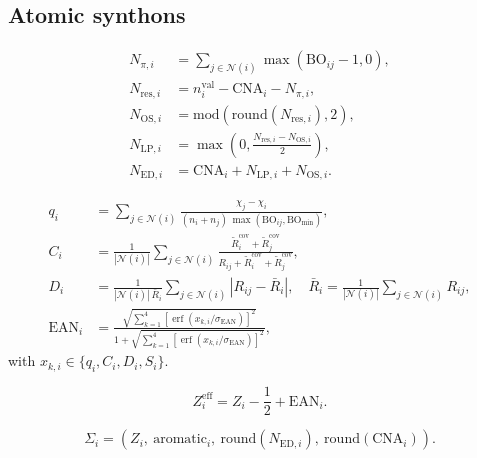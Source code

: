 \documentclass[journal=jctcce,manuscript=article]{achemso}
\begin{document}
\subsection{Atomic synthons}
\begin{align}
N_{\pi,i} &= \sum_{j\in\mathcal{N}(i)} \max(\mathrm{BO}_{ij}-1,0),\\
N_{\mathrm{res},i} &= n^{\mathrm{val}}_i-\mathrm{CNA}_i-N_{\pi,i},\\
N_{\mathrm{OS},i} &= \mathrm{mod}\!\left(\mathrm{round}(N_{\mathrm{res},i}),2\right),\\
N_{\mathrm{LP},i} &= \max\!\left(0,\frac{N_{\mathrm{res},i}-N_{\mathrm{OS},i}}{2}\right),\\
N_{\mathrm{ED},i} &= \mathrm{CNA}_i+N_{\mathrm{LP},i}+N_{\mathrm{OS},i}.
\end{align}

\begin{align}
q_i &= \sum_{j\in\mathcal{N}(i)}
\frac{\chi_j-\chi_i}{(n_i+n_j)\,\max(\mathrm{BO}_{ij},\mathrm{BO}_{\min})},\\
C_i &= \frac{1}{|\mathcal{N}(i)|}\sum_{j\in\mathcal{N}(i)}
\frac{\tilde R^{\mathrm{cov}}_i+\tilde R^{\mathrm{cov}}_j}
{R_{ij}+\tilde R^{\mathrm{cov}}_i+\tilde R^{\mathrm{cov}}_j},\\
D_i &= \frac{1}{|\mathcal{N}(i)|\,\bar R_i}\sum_{j\in\mathcal{N}(i)}\left|R_{ij}-\bar R_i\right|,
\quad
\bar R_i=\frac{1}{|\mathcal{N}(i)|}\sum_{j\in\mathcal{N}(i)}R_{ij},\\
\mathrm{EAN}_i &= \frac{\sqrt{\sum_{k=1}^{4}\left[\operatorname{erf}(x_{k,i}/\sigma_{\mathrm{EAN}})\right]^2}}
{1+\sqrt{\sum_{k=1}^{4}\left[\operatorname{erf}(x_{k,i}/\sigma_{\mathrm{EAN}})\right]^2}},
\end{align}
with $x_{k,i}\in\{q_i,C_i,D_i,S_i\}$.

\begin{equation}
Z^{\mathrm{eff}}_i = Z_i-\frac{1}{2}+\mathrm{EAN}_i.
\end{equation}

\begin{equation}
\Sigma_i=\left(Z_i,\ \mathrm{aromatic}_i,\ \mathrm{round}(N_{\mathrm{ED},i}),\ \mathrm{round}(\mathrm{CNA}_i)\right).
\end{equation}
\end{document}

